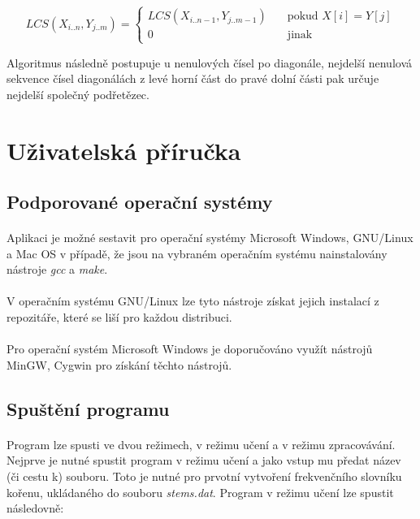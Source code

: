 ﻿\documentclass[12pt, a4paper]{article}
\begin{document}
\[ LCS(X_{i..n}, Y_{j..m}) =
    \begin{cases}
        LCS(X_{i..n - 1}, Y_{j..m - 1})		& \quad \text{pokud } X[i] = Y[j] \\
        0 									& \quad \text{jinak}
    \end{cases}
\]

Algoritmus následně postupuje u nenulových čísel po diagonále, nejdelší nenulová sekvence čísel diagonálách z levé horní část do pravé dolní části pak určuje nejdelší společný podřetězec.

\newpage
\section{Uživatelská příručka}
\subsection{Podporované operační systémy}
\paragraph{}
Aplikaci je možné sestavit pro operační systémy Microsoft Windows, GNU/Linux a Mac OS v případě, že jsou na vybraném operačním systému nainstalovány nástroje \textit{gcc} a \textit{make}.

\paragraph{}
V operačním systému GNU/Linux lze tyto nástroje získat jejich instalací z repozitáře, které se liší pro každou distribuci.

\paragraph{}
Pro operační systém Microsoft Windows je doporučováno využít nástrojů MinGW, Cygwin pro získání těchto nástrojů.

\subsection{Spuštění programu}
\paragraph{}
Program lze spusti ve dvou režimech, v režimu učení a v režimu zpracovávání. Nejprve je nutné spustit program v režimu učení a jako vstup mu předat název (či cestu k) souboru. Toto je nutné pro prvotní vytvoření frekvenčního slovníku kořenu, ukládaného do souboru \textit{stems.dat}. Program v režimu učení lze spustit následovně: 
\end{document}
